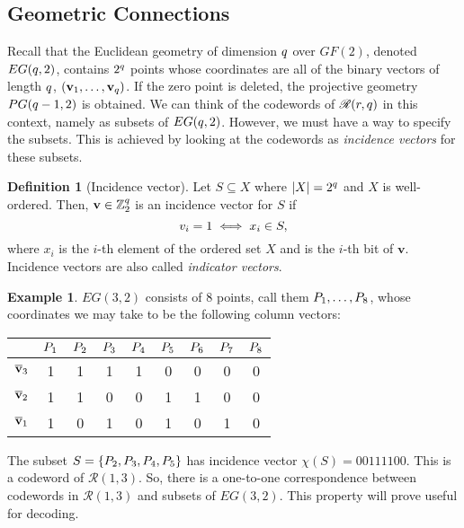 \documentclass[12pt,twoside]{reedthesis}
\theoremstyle{definition}
\newtheorem{definition}[theorem]{Definition}
\newtheorem{example}[theorem]{Example}
\newcommand{\Z}{\mathbb{Z}}
\begin{document}
\subsection{Geometric Connections}
Recall that the Euclidean geometry of dimension $q$ over $GF(2)$, denoted $EG(q,2)$, contains $2^q$ points whose coordinates are all of the binary vectors of length $q$, $(\mathbf{v}_{1}, \ldots, \mathbf{v}_{q})$. If the zero point is deleted, the projective geometry $PG(q-1, 2)$ is obtained. We can think of the codewords of $\mathscr{R}(r,q)$ in this context, namely as subsets of $EG(q,2)$. However, we must have a way to specify the subsets. This is achieved by looking at the codewords as \textit{incidence vectors} for these subsets.

\begin{definition}[Incidence vector] Let $S \subseteq X$ where $\lvert X \rvert = 2^q$ and $X$ is well-ordered. Then, $\mathbf{v} \in \Z_2^\numin$ is an incidence vector for $S$ if
\begin{equation*}
v_{i} = 1 \iff x_i \in S,
\end{equation*}
where $x_i$ is the $i$-th element of the ordered set $X$ and  is the $i$-th bit of $\mathbf{v}$. Incidence vectors are also called \textit{indicator vectors}.
\end{definition}

\begin{example}
$EG(3,2)$ consists of 8 points, call them $P_{1}, \ldots, P_{8}$, whose coordinates we may take to be the following column vectors:
\begin{center}
\begin{tabular}{ c | c c c c c c c c }
 & $P_{1}$ & $P_{2}$ & $P_{3}$ &$ P_{4}$ &$ P_{5}$ &$ P_{6} $& $P_{7}$ & $P_{8}$ \\
 \hline
 $\overline{\mathbf{v}}_{3}$ & 1 & 1 & 1 & 1 & 0 & 0 & 0 & 0\\ 
 $\overline{\mathbf{v}}_{2}$ & 1 & 1 & 0 & 0 & 1 & 1 & 0 & 0\\
$\overline{\mathbf{v}}_{1}$ & 1 & 0 & 1 & 0 & 1 & 0 & 1 & 0 
\end{tabular}
\end{center}

The subset $S = \{P_{2}, P_{3}, P_{4}, P_{5}\}$ has incidence vector $\chi(S) = 00111100$. This is a codeword of $\mathscr{R}(1,3)$. So, there is a one-to-one correspondence between codewords in $\mathscr{R}(1,3)$ and subsets of $EG(3,2)$. This property will prove useful for decoding.
\end{example}
\end{document}
